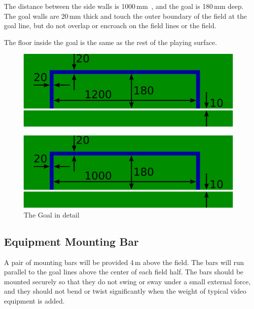 The distance between the side walls is  1000\,mm\ , and the goal is 180\,mm deep.
The goal walls are 20\,mm thick and touch the outer boundary of the field at
the goal line, but do not overlap or encroach on the field lines or the field. 

The floor inside the goal is the same as the rest of the playing surface.

\begin{figure}[ht] %
  \centering
  \includegraphics[width=0.5\columnwidth]{img/goal_detail_divisionA.png}
  \caption{}
  \label{fig:sslgoal-divisionA}
\end{figure}

\begin{figure}[ht] %
  \centering
  \includegraphics[width=0.5\columnwidth]{img/goal_detail_divisionB.png}
  \caption{The Goal in detail }
  \label{fig:sslgoal-divisionB}
\end{figure}

\subsection{Equipment Mounting Bar}

A pair of mounting bars will be provided 4\,m
above the field. The bars will run parallel to the goal lines above the
center of each field half. The bars should be mounted
securely so that they do not swing or sway under a
small external force, and they should not bend or twist
significantly when the weight of typical video equipment is added.

